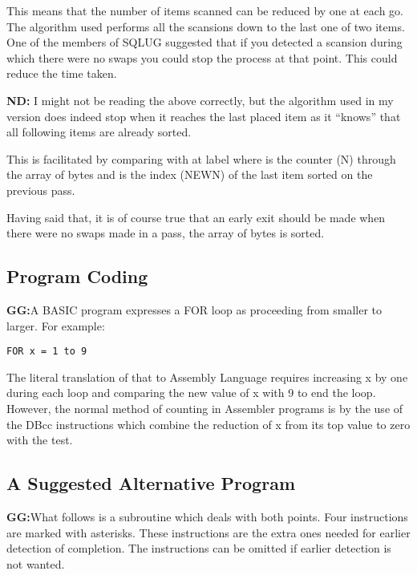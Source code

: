 This means that the number of items scanned can be reduced by one at each go. The algorithm used performs all the scansions down to the last one of two items. One of the members of SQLUG suggested that if you detected a scansion during which there were no swaps you could stop the process at that point. This could reduce the time taken.

\textbf{ND: }I might not be reading the above correctly, but the algorithm used in my version does indeed stop when it reaches the last placed item as it ``knows'' that all following items are already sorted.

This is facilitated by comparing  with  at label  where  is the counter (N) through the array of bytes and  is the index (NEWN) of the last item sorted on the previous pass.

Having said that, it is of course true that an early exit should be made when there were no swaps made in a pass, the array of bytes is sorted.


\subsection{Program Coding}

\textbf{GG:}A BASIC program expresses a FOR loop as proceeding from smaller to larger. For example:

\begin{lstlisting}[firstnumber=1,caption={SuberBasic FOR Statement}]
FOR x = 1 to 9
\end{lstlisting}


The literal translation of that to Assembly Language requires increasing x by one during each loop and comparing the new value of x with 9 to end the loop. However, the normal method of counting in Assembler programs is by the use of the DBcc instructions which combine the reduction of x from its top value to zero with the test.


\subsection{A Suggested Alternative Program}

\textbf{GG:}What follows is a subroutine which deals with both points. Four instructions are marked with asterisks. These instructions are the extra ones needed for earlier detection of completion. The instructions can be omitted if earlier detection is not wanted. 

